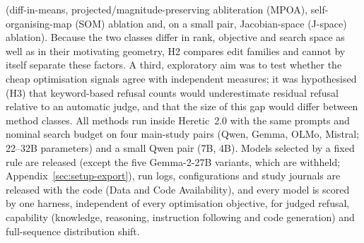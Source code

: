 (diff-in-means, projected/magnitude-preserving abliteration (MPOA),
self-organising-map (SOM) ablation and, on a small pair, Jacobian-space
(J-space) ablation). Because the two classes differ in rank, objective and
search space as well as in their motivating geometry, H2 compares edit
families and cannot by itself separate these factors. A third, exploratory aim was to test whether the cheap
optimisation signals agree with independent measures; it was hypothesised
(H3) that keyword-based refusal counts would underestimate residual refusal
relative to an automatic judge, and that the size of this gap would differ
between method classes. All methods run inside Heretic~2.0 with the same
prompts and nominal search budget on four main-study pairs (Qwen, Gemma, OLMo,
Mistral; 22--32B parameters)
and a small Qwen pair (7B, 4B).
Models selected by a fixed rule are released (except the five Gemma-2-27B
variants, which are withheld; Appendix~\ref{sec:setup-export}), run logs, configurations and
study journals are released with the code (Data and Code Availability), and
every model is scored by one harness,
independent of every optimisation objective, for judged refusal, capability
(knowledge, reasoning, instruction following \cite{young2025when} and code
generation) and full-sequence distribution shift.


